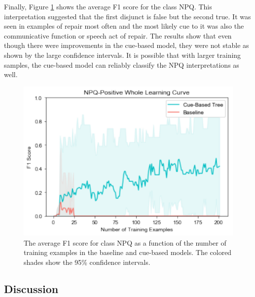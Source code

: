 \documentclass[floatsintext,man]{apa6}
\theoremstyle{definition}
\theoremstyle{definition}
\theoremstyle{definition}
\theoremstyle{remark}
\begin{document}
Finally, Figure \ref{fig:NPQWhole} shows the average F1 score for the
class NPQ. This interpretation suggested that the first disjunct is
false but the second true. It was seen in examples of repair most often
and the most likely cue to it was also the communicative function or
speech act of repair. The results show that even though there were
improvements in the cue-based model, they were not stable as shown by
the large confidence intervals. It is possible that with larger training
samples, the cue-based model can reliably classify the NPQ
interpretations as well.

\begin{figure}
\centering
\includegraphics{figs/NPQWhole-1.pdf}
\caption{\label{fig:NPQWhole}The average F1 score for class NPQ as a
function of the number of training examples in the baseline and
cue-based models. The colored shades show the 95\% confidence
intervals.}
\end{figure}

\subsection{Discussion}\label{discussion}
\end{document}
